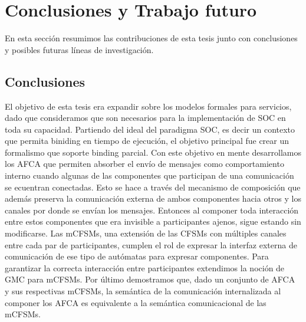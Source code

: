 \newpage
\chapter{Conclusiones y Trabajo futuro} 
\label{conclusiones}

En esta sección resumimos las contribuciones de esta tesis junto con conclusiones y posibles futuras líneas de investigación.


\section{Conclusiones} 

El objetivo de esta tesis era expandir sobre los modelos formales para servicios, dado que consideramos que son necesarios para la implementación de SOC en toda su capacidad. Partiendo del ideal del paradigma SOC, es decir un contexto que permita biniding en tiempo de ejecución, el objetivo principal fue crear un formalismo que soporte binding parcial. Con este objetivo en mente desarrollamos los AFCA que permiten absorber el envío de mensajes como comportamiento interno cuando algunas de las componentes que participan de una comunicación se ecuentran conectadas. Esto se hace a través del mecanismo de composición que además preserva la comunicación externa de ambos componentes hacia otros y los canales por donde se envían los mensajes. Entonces al componer toda interacción entre estos componentes que era invisible a participantes ajenos, sigue estando sin modificarse. Las mCFSMs, una extensión de las CFSMs con múltiples canales entre cada par de participantes, cumplen el rol de expresar la interfaz externa de comunicación de ese tipo de autómatas para expresar componentes. Para garantizar la correcta interacción entre participantes extendimos la noción de GMC para mCFSMs. Por último demostramos que, dado un conjunto de AFCA y sus respectivas mCFSMs, la semántica de la comunicación internalizada al componer los AFCA es equivalente a la semántica comunicacional de las mCFSMs. 




